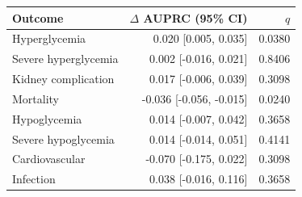 \begin{tabular}{lrr}
\toprule
Outcome & $\Delta$ AUPRC (95\% CI) & $q$ \\
\midrule
Hyperglycemia & 0.020 [0.005, 0.035] & 0.0380 \\
Severe hyperglycemia & 0.002 [-0.016, 0.021] & 0.8406 \\
Kidney complication & 0.017 [-0.006, 0.039] & 0.3098 \\
Mortality & -0.036 [-0.056, -0.015] & 0.0240 \\
Hypoglycemia & 0.014 [-0.007, 0.042] & 0.3658 \\
Severe hypoglycemia & 0.014 [-0.014, 0.051] & 0.4141 \\
Cardiovascular & -0.070 [-0.175, 0.022] & 0.3098 \\
Infection & 0.038 [-0.016, 0.116] & 0.3658 \\
\bottomrule
\end{tabular}
